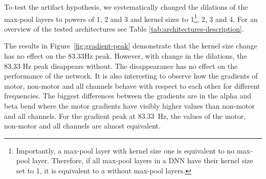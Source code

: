To test the artifact hypothesis, we systematically changed the dilations of the max-pool layers to powers of 1, 2 and 3 and kernel sizes to 1\footnote{Importantly, a max-pool layer with kernel size one is equivalent to no max-pool layer. Therefore, if all max-pool layers in a DNN have their kernel size set to 1, it is equivalent to a  without max-pool layers.}, 2, 3 and 4. For an overview of the tested architectures see Table \ref{tab:architectures-description}.

The results in Figure~\ref{fig:gradient-peak} demonstrate that the kernel size change has no effect on the 83.33Hz peak.
However, with change in the dilations, the 83.33 Hz peak disappears without.
The disappearance has no effect on the performance of the network. 
It is also interesting to observe how the gradients of motor, non-motor and all channels behave with respect to each other for different frequencies.
The biggest differences between the gradients are in the alpha and beta bend where the motor gradients have visibly higher values than non-motor and all channels.
For the gradient peak at 83.33~Hz, the values of the motor, non-motor and all channels are almost equivalent. \\

